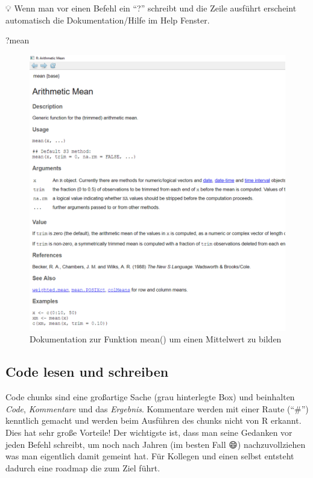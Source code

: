 \documentclass[
]{article}
\newenvironment{Shaded}{\begin{snugshade}}{\end{snugshade}}
\newcommand{\NormalTok}[1]{#1}
\begin{document}
💡 Wenn man vor einen Befehl ein ``?'' schreibt und die Zeile ausführt erscheint automatisch die Dokumentation/Hilfe im Help Fenster.

\begin{Shaded}
\begin{Highlighting}[]
\NormalTok{?mean}
\end{Highlighting}
\end{Shaded}

\begin{figure}

{\centering \includegraphics[width=1\linewidth]{images/012} 

}

\caption{Dokumentation zur Funktion mean() um einen Mittelwert zu bilden}\label{fig:unnamed-chunk-19}
\end{figure}

\hypertarget{code-lesen-und-schreiben}{%
\subsection{Code lesen und schreiben}\label{code-lesen-und-schreiben}}

Code chunks sind eine großartige Sache (grau hinterlegte Box) und beinhalten \emph{Code}, \emph{Kommentare} und das \emph{Ergebnis}. Kommentare werden mit einer Raute (``\#'') kenntlich gemacht und werden beim Ausführen des chunks nicht von R erkannt. Dies hat sehr große Vorteile! Der wichtigste ist, dass man seine Gedanken vor jeden Befehl schreibt, um noch nach Jahren (im besten Fall 😄) nachzuvollziehen was man eigentlich damit gemeint hat. Für Kollegen und einen selbst entsteht dadurch eine roadmap die zum Ziel führt.
\end{document}
